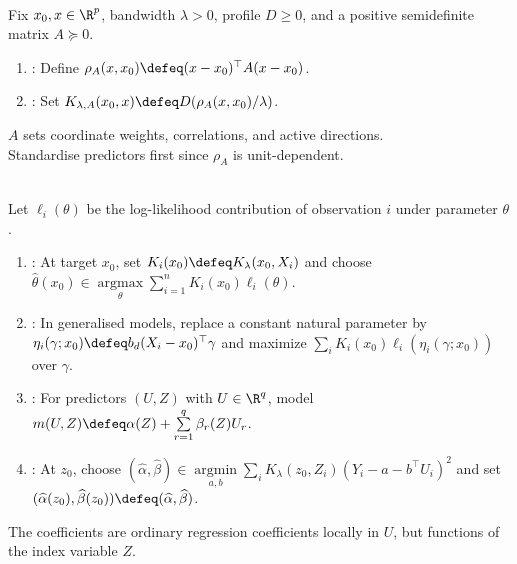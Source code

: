 \begin{definition} \label{def:structured-local-kernel-metric} \\
Fix $x_0,x\in\R^p$, bandwidth $\lambda>0$, profile $D\geq0$, and a positive semidefinite matrix $A\succeq0$.
\begin{enumerate}[label=(\roman*)]
\setlength{\itemsep}{0pt}
\item {}: Define $\rho_A(x,x_0)\defeq (x-x_0)^\top A(x-x_0)$.
\item {}: Set $K_{\lambda,A}(x_0,x)\defeq D(\rho_A(x,x_0)/\lambda)$.
\end{enumerate}
$A$ sets coordinate weights, correlations, and active directions.\\
Standardise predictors first since $\rho_A$ is unit-dependent.
\end{definition}

\begin{method} \label{meth:local-likelihood-and-varying-coefficients} \\
Let $\ell_i(\theta)$ be the log-likelihood contribution of observation $i$ under parameter $\theta$.
\begin{enumerate}[label=(\roman*)]
\setlength{\itemsep}{0pt}
\item {}: At target $x_0$, set $K_i(x_0)\defeq K_\lambda(x_0,X_i)$ and choose $\widehat{\theta}(x_0)\in\operatorname*{argmax}\limits_\theta\sum\limits_{i=1}^nK_i(x_0)\ell_i(\theta)$.
\item {}: In generalised models, replace a constant natural parameter by\\
$\eta_i(\gamma;x_0)\defeq b_d(X_i-x_0)^\top\gamma$ and maximize $\sum\limits_iK_i(x_0)\ell_i(\eta_i(\gamma;x_0))$ over $\gamma$.
\item {}: For predictors $(U,Z)$ with $U\in\R^q$, model $m(U,Z)\defeq\alpha(Z)+\sum\limits_{r=1}^q\beta_r(Z)U_r$.
\item {}: At $z_0$, choose $(\widehat{\alpha},\widehat{\beta})\in\operatorname*{argmin}\limits_{a,b}\sum\limits_iK_\lambda(z_0,Z_i)(Y_i-a-b^\top U_i)^2$ and set $(\widehat{\alpha}(z_0),\widehat{\beta}(z_0))\defeq(\widehat{\alpha},\widehat{\beta})$.
\end{enumerate}
The coefficients are ordinary regression coefficients locally in $U$, but functions of the index variable $Z$.
\end{method}

